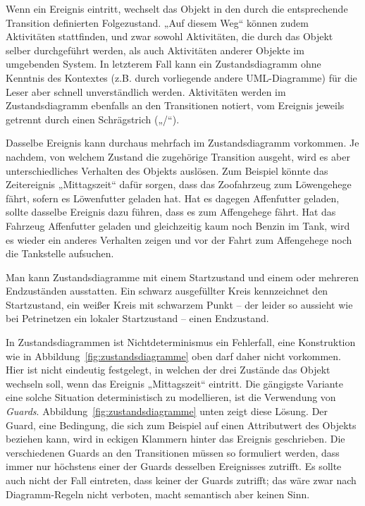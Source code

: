 \vspace{0.9mm} %

Wenn ein Ereignis eintritt, 
wechselt das Objekt in den durch die entsprechende Transition definierten Folgezustand. „Auf diesem Weg“ können zudem Aktivitäten stattfinden, und zwar sowohl Aktivitäten, 
die durch das Objekt selber durchgeführt werden, als auch Aktivitäten anderer Objekte im umgebenden System. In letzterem Fall kann ein Zustandsdiagramm ohne Kenntnis des Kontextes (z.B. durch vorliegende andere UML-Diagramme) für die Leser aber schnell unverständlich werden. Aktivitäten werden im Zustandsdiagramm ebenfalls an den Transitionen notiert, vom Ereignis jeweils getrennt durch einen Schrägstrich („/“). 

\vspace{0.9mm} %

Dasselbe Ereignis kann durchaus mehrfach im Zustandsdiagramm vorkommen. Je nachdem, von welchem Zustand die zugehörige Transition ausgeht, wird es aber unterschiedliches Verhalten des Objekts auslösen. Zum Beispiel könnte das Zeitereignis „Mittagszeit“ dafür sorgen, dass das Zoofahrzeug zum Löwengehege fährt, sofern es Löwenfutter geladen hat. Hat es dagegen Affenfutter geladen, sollte dasselbe Ereignis dazu führen, dass es zum Affengehege fährt. Hat das Fahrzeug Affenfutter geladen und gleichzeitig kaum noch Benzin im Tank, wird es wieder ein anderes Verhalten zeigen und vor der Fahrt zum Affengehege noch die Tankstelle aufsuchen.

\vspace{0.9mm} %

Man kann Zustandsdiagramme mit einem Startzustand 
und einem oder mehreren Endzuständen ausstatten. Ein schwarz ausgefüllter Kreis kennzeichnet den Startzustand, ein weißer Kreis mit schwarzem Punkt -- der leider so aussieht wie bei Petrinetzen ein lokaler Startzustand -- einen Endzustand.

\vspace{0.9mm} %

In Zustandsdiagrammen ist Nichtdeterminismus ein Fehlerfall, 
eine Konstruktion wie in Abbildung~\ref{fig:zustandsdiagramme} oben darf daher nicht vorkommen. Hier ist nicht eindeutig festgelegt, in welchen der drei Zustände das Objekt wechseln soll, wenn das Ereignis „Mittagszeit“ eintritt. Die gängigste Variante eine solche Situation deterministisch zu modellieren, ist die Verwendung von \textit{Guards}.
Abbildung~\ref{fig:zustandsdiagramme} unten zeigt diese Lösung. Der Guard, eine Bedingung, die sich zum Beispiel auf einen Attributwert des Objekts beziehen kann, wird in eckigen Klammern hinter das Ereignis geschrieben. Die verschiedenen Guards an den Transitionen müssen so formuliert werden, dass immer nur höchstens einer der Guards desselben Ereignisses zutrifft. Es sollte auch nicht der Fall eintreten, dass keiner der Guards zutrifft; das wäre zwar nach Diagramm-Regeln nicht verboten, macht semantisch aber keinen Sinn. 


